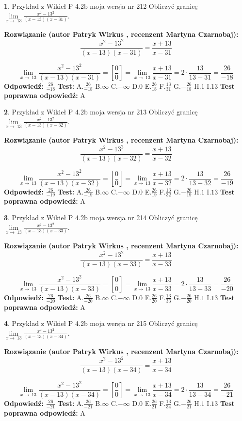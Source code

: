 \documentclass[12pt, a4paper]{article}
\theoremstyle{definition} %
\newtheorem{zad}{}
\newcommand{\zadStart}[1]{\begin{zad}#1\newline}
\newcommand{\zadStop}{\end{zad}}
\newcommand{\rozwStart}[2]{\noindent \textbf{Rozwiązanie (autor #1 , recenzent #2): }\newline}
\newcommand{\rozwStop}{\newline}
\newcommand{\odpStart}{\noindent \textbf{Odpowiedź:}\newline}
\newcommand{\odpStop}{\newline}
\newcommand{\testStart}{\noindent \textbf{Test:}\newline}
\newcommand{\testStop}{\newline}
\newcommand{\kluczStart}{\noindent \textbf{Test poprawna odpowiedź:}\newline}
\newcommand{\kluczStop}{\newline}
\begin{document}
\zadStart{Przykład z Wikieł P 4.2b moja wersja nr 212}
Obliczyć granicę $\lim\limits_{x\to\ 13}\frac{x^{2}-13^{2}}{(x-13)(x-31)}$.
\zadStop
\rozwStart{Patryk Wirkus}{Martyna Czarnobaj}
$$\frac{x^{2}-13^{2}}{(x-13)(x-31)}=\frac{x+13}{x-31}$$

$$\lim\limits_{x\to\ 13}\frac{x^{2}-13^{2}}{(x-13)(x-31)}=[\frac{0}{0}]=\lim\limits_{x\to\ 13}\frac{x+13}{x-31}=2 \cdot \frac{13}{13-31} = \frac{26}{-18}$$
\rozwStop
\odpStart
$\frac{26}{-18}$
\odpStop
\testStart
A.$\frac{26}{-18}$
B.$\infty$
C.$-\infty$
D.$0$
E.$\frac{26}{18}$
F.$\frac{13}{31}$
G.$-\frac{26}{18}$
H.$1$
I.$13$
\testStop
\kluczStart
A
\kluczStop



\zadStart{Przykład z Wikieł P 4.2b moja wersja nr 213}
Obliczyć granicę $\lim\limits_{x\to\ 13}\frac{x^{2}-13^{2}}{(x-13)(x-32)}$.
\zadStop
\rozwStart{Patryk Wirkus}{Martyna Czarnobaj}
$$\frac{x^{2}-13^{2}}{(x-13)(x-32)}=\frac{x+13}{x-32}$$

$$\lim\limits_{x\to\ 13}\frac{x^{2}-13^{2}}{(x-13)(x-32)}=[\frac{0}{0}]=\lim\limits_{x\to\ 13}\frac{x+13}{x-32}=2 \cdot \frac{13}{13-32} = \frac{26}{-19}$$
\rozwStop
\odpStart
$\frac{26}{-19}$
\odpStop
\testStart
A.$\frac{26}{-19}$
B.$\infty$
C.$-\infty$
D.$0$
E.$\frac{26}{19}$
F.$\frac{13}{32}$
G.$-\frac{26}{19}$
H.$1$
I.$13$
\testStop
\kluczStart
A
\kluczStop



\zadStart{Przykład z Wikieł P 4.2b moja wersja nr 214}
Obliczyć granicę $\lim\limits_{x\to\ 13}\frac{x^{2}-13^{2}}{(x-13)(x-33)}$.
\zadStop
\rozwStart{Patryk Wirkus}{Martyna Czarnobaj}
$$\frac{x^{2}-13^{2}}{(x-13)(x-33)}=\frac{x+13}{x-33}$$

$$\lim\limits_{x\to\ 13}\frac{x^{2}-13^{2}}{(x-13)(x-33)}=[\frac{0}{0}]=\lim\limits_{x\to\ 13}\frac{x+13}{x-33}=2 \cdot \frac{13}{13-33} = \frac{26}{-20}$$
\rozwStop
\odpStart
$\frac{26}{-20}$
\odpStop
\testStart
A.$\frac{26}{-20}$
B.$\infty$
C.$-\infty$
D.$0$
E.$\frac{26}{20}$
F.$\frac{13}{33}$
G.$-\frac{26}{20}$
H.$1$
I.$13$
\testStop
\kluczStart
A
\kluczStop



\zadStart{Przykład z Wikieł P 4.2b moja wersja nr 215}
Obliczyć granicę $\lim\limits_{x\to\ 13}\frac{x^{2}-13^{2}}{(x-13)(x-34)}$.
\zadStop
\rozwStart{Patryk Wirkus}{Martyna Czarnobaj}
$$\frac{x^{2}-13^{2}}{(x-13)(x-34)}=\frac{x+13}{x-34}$$

$$\lim\limits_{x\to\ 13}\frac{x^{2}-13^{2}}{(x-13)(x-34)}=[\frac{0}{0}]=\lim\limits_{x\to\ 13}\frac{x+13}{x-34}=2 \cdot \frac{13}{13-34} = \frac{26}{-21}$$
\rozwStop
\odpStart
$\frac{26}{-21}$
\odpStop
\testStart
A.$\frac{26}{-21}$
B.$\infty$
C.$-\infty$
D.$0$
E.$\frac{26}{21}$
F.$\frac{13}{34}$
G.$-\frac{26}{21}$
H.$1$
I.$13$
\testStop
\kluczStart
A
\kluczStop
\end{document}
